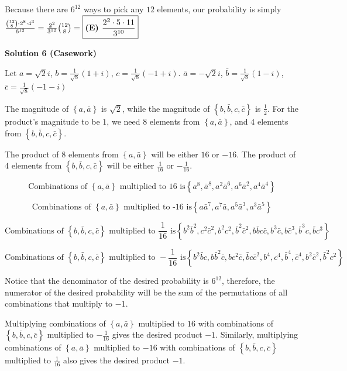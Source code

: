 \begin{enumerate}
 Because there are $6^{12}$ ways to pick any $12$ elements, our probability is simply $\frac{{12 \choose 8} \cdot 2^8 \cdot 4^3}{6^{12}} = \frac{2^2}{3^{12}} {12 \choose 8} = \boxed{\text{\textbf{(E) }} \frac{2^2\cdot5\cdot11}{3^{10}} }$




\textbf{Solution 6 (Casework)}

Let $a = \sqrt{2}i$, $b = \frac{1}{\sqrt{8}}(1+i)$, $c = \frac{1}{\sqrt{8}}(-1+i)$. $\bar{a} = -\sqrt{2}i$, $\bar{b} = \frac{1}{\sqrt{8}}(1-i)$, $\bar{c} = \frac{1}{\sqrt{8}}(-1-i)$

 The magnitude of $\left\{ a, \bar{a} \right\}$ is $\sqrt{2}$, while the magnitude of $\left\{ b, \bar{b}, c, \bar{c} \right\}$ is $\frac12$. For the product's magnitude to be $1$, we need $8$ elements from $\left\{ a, \bar{a} \right\}$, and $4$ elements from $\left\{ b, \bar{b}, c, \bar{c} \right\}$.

 The product of $8$ elements from $\left\{ a, \bar{a} \right\}$ will be either $16$ or $-16$. The product of $4$ elements from $\left\{ b, \bar{b}, c, \bar{c} \right\}$ will be either $\frac{1}{16}$ or $-\frac{1}{16}$.

 
 \[\text{Combinations of } \left\{ a, \bar{a} \right\} \text{ multiplied to 16 is} \left\{ a^8, \bar{a}^8, a^2\bar{a}^6, a^6\bar{a}^2, a^4\bar{a}^4 \right\}\]

 \[\text{Combinations of } \left\{ a, \bar{a} \right\} \text{ multiplied to -16 is} \left\{ a\bar{a}^7, a^7\bar{a}, a^5\bar{a}^3, a^3\bar{a}^5 \right\}\]

 \[\text{Combinations of } \left\{ b, \bar{b}, c, \bar{c} \right\} \text{ multiplied to } \frac{1}{16} \text{ is} \left\{ b^2\bar{b}^2, c^2\bar{c}^2, b^2c^2, \bar{b}^2\bar{c}^2, b\bar{b}c\bar{c}, b^3\bar{c}, b\bar{c}^3, \bar{b}^3c, \bar{b}c^3 \right\}\]

 \[\text{Combinations of } \left\{ b, \bar{b}, c, \bar{c} \right\} \text{ multiplied to } -\frac{1}{16} \text{ is} \left\{ b^2\bar{b}c, b\bar{b}^2\bar{c}, bc^2\bar{c}, \bar{b}c\bar{c}^2, b^4, c^4, \bar{b}^4, \bar{c}^4, b^2\bar{c}^2, \bar{b}^2c^2 \right\}\]

 Notice that the denominator of the desired probability is $6^{12}$, therefore, the numerator of the desired probability will be the sum of the permutations of all combinations that multiply to $-1$.

 Multiplying combinations of $\left\{ a, \bar{a} \right\}$ multiplied to $16$ with combinations of $\left\{ b, \bar{b}, c, \bar{c} \right\}$ multiplied to $-\frac{1}{16}$ gives the desired product $-1$. Similarly, multiplying combinations of $\left\{ a, \bar{a} \right\}$ multiplied to $-16$ with combinations of $\left\{ b, \bar{b}, c, \bar{c} \right\}$ multiplied to $\frac{1}{16}$ also gives the desired product $-1$.


\end{enumerate}
